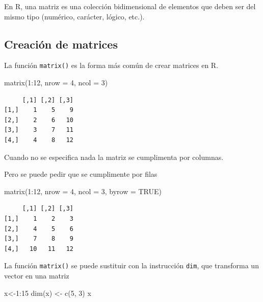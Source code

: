 \documentclass[
  letterpaper,
]{scrbook}
\newenvironment{Shaded}{\begin{snugshade}}{\end{snugshade}}
\newcommand{\AttributeTok}[1]{\textcolor[rgb]{0.40,0.45,0.13}{#1}}
\newcommand{\ConstantTok}[1]{\textcolor[rgb]{0.56,0.35,0.01}{#1}}
\newcommand{\DecValTok}[1]{\textcolor[rgb]{0.68,0.00,0.00}{#1}}
\newcommand{\FunctionTok}[1]{\textcolor[rgb]{0.28,0.35,0.67}{#1}}
\newcommand{\NormalTok}[1]{\textcolor[rgb]{0.00,0.23,0.31}{#1}}
\newcommand{\OtherTok}[1]{\textcolor[rgb]{0.00,0.23,0.31}{#1}}
\newcommand{\SpecialCharTok}[1]{\textcolor[rgb]{0.37,0.37,0.37}{#1}}
\begin{document}
En R, una matriz es una colección bidimensional de elementos que deben
ser del mismo tipo (numérico, carácter, lógico, etc.).

\hypertarget{creaciuxf3n-de-matrices}{%
\subsection{Creación de matrices}\label{creaciuxf3n-de-matrices}}

La función \texttt{matrix()} es la forma más común de crear matrices en
R.

\begin{Shaded}
\begin{Highlighting}[]
\FunctionTok{matrix}\NormalTok{(}\DecValTok{1}\SpecialCharTok{:}\DecValTok{12}\NormalTok{, }\AttributeTok{nrow =} \DecValTok{4}\NormalTok{, }\AttributeTok{ncol =} \DecValTok{3}\NormalTok{)}
\end{Highlighting}
\end{Shaded}

\begin{verbatim}
     [,1] [,2] [,3]
[1,]    1    5    9
[2,]    2    6   10
[3,]    3    7   11
[4,]    4    8   12
\end{verbatim}

Cuando no se especifica nada la matriz se cumplimenta por columnas.

Pero se puede pedir que se cumplimente por filas

\begin{Shaded}
\begin{Highlighting}[]
\FunctionTok{matrix}\NormalTok{(}\DecValTok{1}\SpecialCharTok{:}\DecValTok{12}\NormalTok{, }\AttributeTok{nrow =} \DecValTok{4}\NormalTok{, }\AttributeTok{ncol =} \DecValTok{3}\NormalTok{, }\AttributeTok{byrow =} \ConstantTok{TRUE}\NormalTok{)}
\end{Highlighting}
\end{Shaded}

\begin{verbatim}
     [,1] [,2] [,3]
[1,]    1    2    3
[2,]    4    5    6
[3,]    7    8    9
[4,]   10   11   12
\end{verbatim}

La función \texttt{matrix()} se puede sustituir con la instrucción
\texttt{dim}, que transforma un vector en una matriz

\begin{Shaded}
\begin{Highlighting}[]
\NormalTok{x}\OtherTok{\textless{}{-}}\DecValTok{1}\SpecialCharTok{:}\DecValTok{15}
\FunctionTok{dim}\NormalTok{(x) }\OtherTok{\textless{}{-}} \FunctionTok{c}\NormalTok{(}\DecValTok{5}\NormalTok{, }\DecValTok{3}\NormalTok{)}
\NormalTok{x}
\end{Highlighting}
\end{Shaded}
\end{document}
